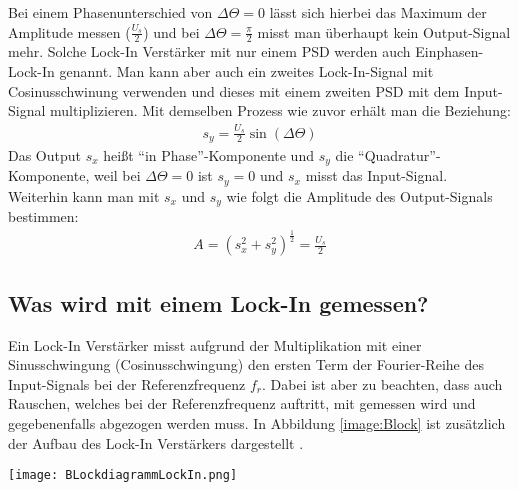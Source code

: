Bei einem Phasenunterschied von $\Delta\Theta = 0$ lässt sich hierbei das Maximum der Amplitude messen ($\frac{U_s}{2}$) und bei $\Delta\Theta = \frac{\pi}{2}$ misst man überhaupt kein Output-Signal mehr. Solche Lock-In Verstärker mit nur einem PSD werden auch Einphasen-Lock-In genannt. Man kann aber auch ein zweites Lock-In-Signal mit Cosinusschwinung verwenden und dieses mit einem zweiten PSD mit dem Input-Signal multiplizieren. Mit demselben Prozess wie zuvor erhält man die Beziehung:
\begin{gather}
    s_{y} = \frac{U_s}{2} \sin(\Delta\Theta) 
\end{gather} 
Das Output $s_x$ heißt \enquote{in Phase}-Komponente und $s_y$ die \enquote{Quadratur}-Komponente, weil bei $\Delta\Theta = 0$ ist $s_y = 0$ und $s_x$ misst das Input-Signal.\\

Weiterhin kann man mit $s_x$ und $s_y$ wie folgt die Amplitude des Output-Signals bestimmen:
\begin{gather}
    A = (s_x^2 + s_y^2)^{\frac{1}{2}} = \frac{U_s}{2}
\end{gather}
\subsection*{Was wird mit einem Lock-In gemessen?}
Ein Lock-In Verstärker misst aufgrund der Multiplikation mit einer Sinusschwingung (Cosinusschwingung) den ersten Term der Fourier-Reihe des Input-Signals bei der Referenzfrequenz $f_r$. Dabei ist aber zu beachten, dass auch Rauschen, welches bei der Referenzfrequenz auftritt, mit gemessen wird und gegebenenfalls abgezogen werden muss. In Abbildung \ref{image:Block} ist zusätzlich der Aufbau des Lock-In Verstärkers dargestellt \citep{lockin}.
\newpage
\begin{center}
    \texttt{[image: BLockdiagrammLockIn.png]}
    \label{image:Block}
\end{center}

\newpage

